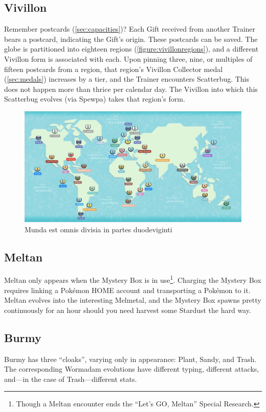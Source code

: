 \subsection{Vivillon\label{subsec:vivillon}}
Remember postcards (\autoref{sec:capacities})?
Each Gift received from another Trainer bears a postcard, indicating the Gift's origin.
These postcards can be saved.
The globe is partitioned into eighteen regions (\autoref{figure:vivillonregions}),
  and a different Vivillon form is associated with each.
Upon pinning three, nine, or multiples of fifteen postcards from a region,
  that region's Vivillon Collector medal (\autoref{sec:medals}) increases
  by a tier, and the Trainer encounters Scatterbug.
This does not happen more than thrice per calendar day.
The Vivillon into which this Scatterbug evolves (via Spewpa) takes that region's form.
\begin{figure}
\centering
\includegraphics[keepaspectratio,width=\textwidth]{images/vivillonregions.png}
\caption{Munda est omnis divisia in partes duodeviginti\label{figure:vivillonregions}}
\end{figure}

\subsection{Meltan\label{subsec:meltan}}
Meltan only appears when the Mystery Box is in use\footnote{Though a Meltan encounter ends the ``Let's GO, Meltan'' Special Research.}.
Charging the Mystery Box requires linking a Pokémon HOME account and transporting
  a Pokémon to it.
Meltan evolves into the interesting Melmetal, and the Mystery
  Box spawns pretty continuously for an hour should you need harvest some Stardust
  the hard way.

\subsection{Burmy}
Burmy has three ``cloaks'', varying only in appearance: Plant, Sandy, and Trash.
The corresponding Wormadam evolutions have different typing, different attacks,
 and---in the case of Trash---different stats.

